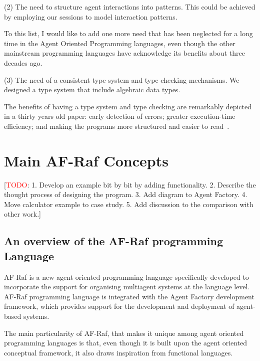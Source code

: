 \documentclass[a4paper,12pt,oneside,fleqn]{book} %
\newcommand{\todo}[1]{[\textcolor{red}{TODO}: #1]}
\begin{document}
(2) The need to structure agent interactions into patterns. This could be
achieved by employing our sessions to model interaction patterns.

To this list, I would like to add one more need that has been neglected for
a long time in the Agent Oriented Programming languages, even though the
other mainstream programming languages have acknowledge its benefits about
three decades ago.

(3) The need of a consistent type system and type checking mechanisms. We
designed a type system that include algebraic data types.


The benefits of having a type system and type checking are remarkably
depicted in a thirty years old paper: early detection of
errors; greater execution-time efficiency; and making the programs more
structured and easier to read~\cite{DBLP:journals/csur/CardelliW85}.


\chapter{Main AF-Raf Concepts}\label{ch:concepts} %

\todo{1. Develop an example bit by bit by adding functionality. 2. Describe
the thought process of designing the program. 3. Add diagram to Agent
Factory. 4. Move calculator example to case study. 5. Add discussion to the
comparison with other work.}

\section{An overview of the AF-Raf programming Language} %

AF-Raf is a new agent oriented programming language specifically developed
to incorporate the support for organising multiagent systems at the
language level. AF-Raf programming language is integrated with the
Agent Factory development framework, which provides support for the
development and deployment of agent-based systems.

The main particularity of AF-Raf, that makes it unique among agent oriented
programming languages is that, even though it is built upon the agent
oriented conceptual framework, it also draws inspiration from functional
languages.
\end{document}
